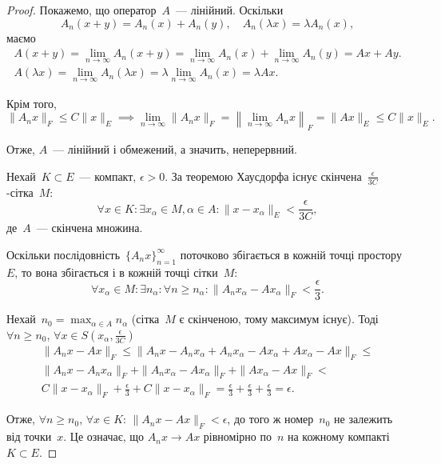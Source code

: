 \begin{proof}
Покажемо, що оператор~$A$~--- лінійний. Оскільки
\begin{equation*}
    A_n(x + y) = A_n(x) + A_n(y), \quad A_n(\lambda x) = \lambda A_n(x),
\end{equation*}
маємо
\begin{gather*}
    A(x + y) =
    \lim_{n \to \infty} A_n(x + y) =
    \lim_{n \to \infty} A_n(x) + \lim_{n \to \infty} A_n(y) =
    A x + A y. \\
    A(\lambda x) =
    \lim_{n \to \infty} A_n(\lambda x) =
    \lambda \lim_{n \to \infty} A_n(x) =
    \lambda A x.
\end{gather*}

Крім того,
\begin{equation*}
    \|A_n x\|_F \le C \|x\|_E \implies
    \lim_{n \to \infty} \|A_n x\|_F =
    \left\| \lim_{n \to \infty} A_n x \right\|_F =
    \|A x\|_E \le C \|x\|_E.
\end{equation*}

Отже, $A$~--- лінійний і обмежений, а значить, неперервний.

Нехай~$K \subset E$~--- компакт, $\epsilon > 0$. За теоремою Хаусдорфа
існує скінчена~$\frac{\epsilon}{3 C}$-сітка~$M$:
\begin{equation*}
    \forall x \in K:
    \exists x_\alpha \in M, \alpha \in A:
    \|x - x_\alpha\|_E < \frac{\epsilon}{3 C},
\end{equation*}
де~$A$~--- скінчена множина.

Оскільки послідовність~$\{A_n x\}_{n = 1}^\infty$
поточково збігається в
кожній точці простору~$E$, то вона збігається і в кожній точці
сітки~$M$:
\begin{equation*}
    \forall x_\alpha \in M:
    \exists n_\alpha:
    \forall n \ge n_\alpha:
    \|A_n x_\alpha - A x_\alpha\|_F < \frac{\epsilon}{3}.
\end{equation*}

Нехай~$n_0 = \max_{\alpha \in A} n_\alpha$ (сітка~$M$ є скінченою, тому максимум існує).
Тоді~$\forall n \ge n_0$, $\forall x \in S\left(x_\alpha, \frac{\epsilon}{3C}\right)$
\begin{multline*}
    \|A_n x - A x\|_F \le
    \|A_n x - A_n x_\alpha + A_n x_\alpha - A x_\alpha + A x_\alpha - A x\|_F \le \\
    \|A_n x - A_n x_\alpha\|_F + \|A_n x_\alpha - A x_\alpha\|_F + \|A x_\alpha - A x\|_F < \\
    C \|x - x_\alpha\|_F + \frac{\epsilon}{3} + C \|x - x_\alpha\|_F =
    \frac{\epsilon}{3} + \frac{\epsilon}{3} + \frac{\epsilon}{3} = \epsilon.
\end{multline*}

Отже, $\forall n \ge n_0$, $\forall x \in K$: $\|A_n x - A x\|_F < \epsilon$,
до того ж номер~$n_0$ не залежить від точки~$x$. Це означає, що
$A_n x \to A x$ рівномірно по~$n$ на кожному компакті~$K \subset E$.
\end{proof}

